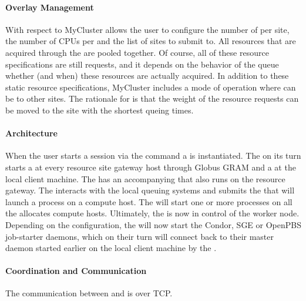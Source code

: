 \documentclass{sig-alternate}
\begin{document}
\paragraph{Overlay Management}
With respect to  MyCluster allows the user to
configure the number of  per site, the number of CPUs per
 and the list of sites to submit to.
All resources that are acquired through the  are pooled
together.
Of course, all of these resource specifications are still requests, and it
depends on the behavior of the queue whether (and when) these resources are
actually acquired.
In addition to these static resource specifications, MyCluster includes a mode
of operation where  can be  to other sites.
The rationale for  is that the weight of the resource
requests can be moved to the site with the shortest queing times.

\paragraph{Architecture}
When the user starts a session via the  command a
 is instantiated.
The  on its turn starts a  at
every resource site gateway host through Globus GRAM and a  at the local client machine.
The  has an accompanying  that
also runs on the resource gateway.
The  interacts with the local queuing systems and
submits the  that will launch a 
process on a compute host.
The  will start one or more 
processes on all the allocates compute hosts.
Ultimately, the  is now in control of the worker
node.
Depending on the configuration, the  will now start
the Condor, SGE or OpenPBS job-starter daemons, which on their turn will
connect back to their master daemon started earlier on the local client machine
by the .

\paragraph{Coordination and Communication}
The communication between  and 
is over TCP.
\end{document}
